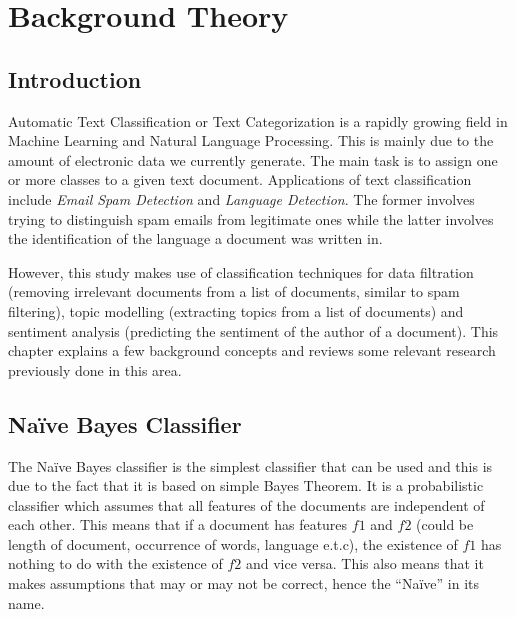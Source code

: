 
\chapter{Background Theory}

\label{ch:background}

\section{Introduction}
\label{sec:background_introduction}

Automatic Text Classification or Text Categorization is a rapidly growing field in Machine Learning
and Natural Language Processing. This is mainly due to the amount of electronic data we currently
generate. The main task is to assign one or more classes to a given text document. Applications of
text classification include \textit{Email Spam Detection} and \textit{Language
Detection}. The former involves trying to distinguish spam emails from legitimate ones while the
latter involves the identification of the language a document was written in.

However, this study makes use of classification techniques for data filtration (removing irrelevant
documents from a list of documents, similar to spam filtering), topic modelling (extracting topics
from a list of documents) and sentiment analysis (predicting the sentiment of the author of a
document). This chapter explains a few background concepts and reviews some relevant research
previously done in this area.

\section{Na\"{i}ve Bayes Classifier}
\label{sec:bg_naive_bayes}
The Na\"{i}ve Bayes classifier is the simplest classifier that can be used and this is due to the
fact that it is based on simple Bayes Theorem. It is a probabilistic classifier which assumes that
all features of the documents are independent of each other. This means that if a document has
features $f1$ and $f2$ (could be length of document, occurrence of words, language e.t.c), the
existence of $f1$ has nothing to do with the existence of $f2$ and vice versa. This also means that
it makes assumptions that may or may not be correct, hence the ``Na\"{i}ve'' in its name.

